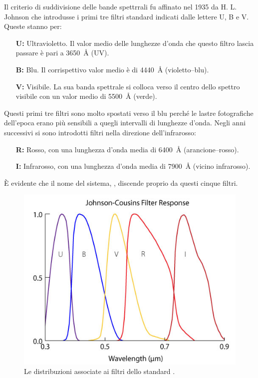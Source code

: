         Il criterio di suddivisione delle bande spettrrali fu affinato nel 1935 da H. L. Johnson che introdusse i primi tre filtri standard indicati dalle lettere U, B e V. Queste stanno per:
        \begin{enumerate}
            \item[\textbf{U:}] Ultravioletto. Il valor medio delle lunghezze d'onda che questo filtro lascia passare è pari a \SI{3650}{\angstrom} (UV).
            \item[\textbf{B:}] Blu. Il corrispettivo valor medio è di \SI{4440}{\angstrom} (violetto--blu).
            \item[\textbf{V:}] Visibile. La sua banda spettrale si colloca verso il centro dello spettro visibile con un valor medio di \SI{5500}{\angstrom} (verde).
        \end{enumerate}
        Questi primi tre filtri sono molto spostati verso il blu perché le lastre fotografiche dell'epoca erano più sensibili a quegli intervalli di lunghezze d'onda. Negli anni successivi si sono introdotti filtri nella direzione dell'infrarosso:
        \begin{enumerate}
            \item[\textbf{R:}] Rosso, con una lunghezza d'onda media di \SI{6400}{\angstrom} (arancione--rosso).
            \item[\textbf{I:}] Infrarosso, con una lunghezza d'onda media di \SI{7900}{\angstrom} (vicino infrarosso).
        \end{enumerate}
        È evidente che il nome del sistema, \emph{\ubvri}, discende proprio da questi cinque filtri.
        \begin{figure}
            \centering
            \includegraphics[width=\imagebig, trim={0 0 0 30pt}, clip]{images/fotometria/Johnson-ubvri.jpg}
            \caption{Le distribuzioni associate ai filtri dello standard \ubvri.}
            \label{fig:Johnson-ubvri}
        \end{figure}
